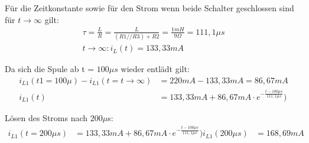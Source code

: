 \documentclass{article}
\begin{document}
Für die Zeitkonstante sowie für den Strom wenn beide Schalter geschlossen sind für $t \rightarrow \infty$ gilt:
\begin{align*}
  \tau = \frac{L}{R} = \frac{L}{(R1//R3)+R2} = \frac{1mH}{9\Omega} = 111,1\mu s\\
  t\rightarrow\infty : i_L(t) = 133,33mA
\end{align*}

Da sich die Spule ab t = $100\mu s$ wieder entlädt gilt:
\begin{align*}
  i_{L1}(t1=100\mu) - i_{L1}(t=t\rightarrow \infty) &= 220mA - 133,33mA = 86,67mA\\
  i_{L1}(t) &= 133,33mA + 86,67mA\cdot e^{-\frac{t-100\mu s}{111,1\mu s}})
\end{align*}


Lösen des Stroms nach $200\mu$s:
\begin{align*}
  i_{L1}(t=200\mu s) &= 133,33mA + 86,67mA\cdot e^{-\frac{t-100\mu s}{111,1\mu s}})
  i_{L1}(200\mu s) &= 168,69mA
\end{align*}
\end{document}
